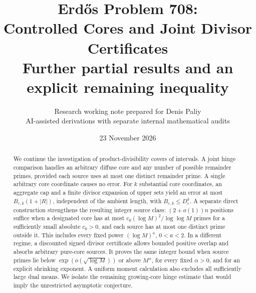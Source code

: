 \documentclass[11pt,a4paper]{article}
\title{\textbf{Erd\H{o}s Problem 708:\\Controlled Cores and Joint Divisor Certificates}\\[5pt]
\large Further partial results and an explicit remaining inequality}
\author{Research working note prepared for Denis Paliy\\
\small AI-assisted derivations with separate internal mathematical audits}
\date{23 November 2026}
\theoremstyle{remark}
\begin{document}
\maketitle
\begin{center}
\end{center}
\begin{abstract}
We continue the investigation of product-divisibility covers of
intervals. A joint hinge comparison handles an arbitrary diffuse
core and any number of possible remainder primes, provided each
source uses at most one distinct remainder prime. A single arbitrary
core coordinate causes no error. For \(k\) substantial core
coordinates, an aggregate cap and a finite divisor expansion of
upper sets yield an error at most \(B_{\varepsilon,k}(1+|R|)\),
independent of the ambient length, with
\(B_{\varepsilon,k}\le D_\varepsilon^k\). A separate direct
construction strengthens the resulting integer source class:
\((2+o(1))n\) positions suffice when a designated core has at most
\(c_0(\log M)^2/\log\log M\) primes for a sufficiently small
absolute \(c_0>0\), and each source has at most one distinct prime
outside it. This includes every fixed power \((\log M)^a\),
\(0<a<2\). In a
different regime, a discounted signed divisor certificate allows
bounded positive overlap and absorbs arbitrary pure-core sources.
It proves the same integer bound when source primes lie below
\(\exp(o(\sqrt{\log M}))\) or above \(M^\alpha\), for every fixed
\(\alpha>0\), and for an explicit shrinking exponent. A uniform
moment calculation also excludes all sufficiently large dual means.
We isolate the remaining growing-core hinge estimate that would
imply the unrestricted asymptotic conjecture.
\end{abstract}
\begingroup
\small
\setcounter{tocdepth}{1}
\setlength{\parskip}{1pt}
\makeatletter
\renewcommand{\l@section}[2]{\@dottedtocline{1}{0em}{2em}{#1}{#2}}
\makeatother
\tableofcontents
\endgroup
\newpage
\end{document}
